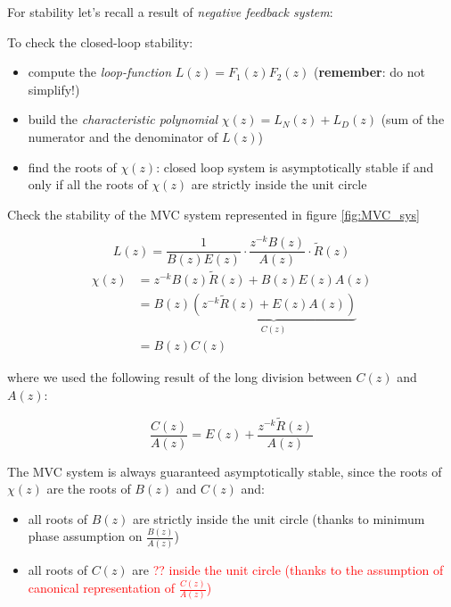 \begin{recall}
    For stability let's recall a result of \emph{negative feedback system}:
    \begin{figure}[H]
        \centering
    \end{figure}

    To check the closed-loop stability:
    \begin{itemize}
        \item compute the \emph{loop-function} $L(z) = F_1(z) F_2(z)$ (\textbf{remember}: do not simplify!)
        \item build the \emph{characteristic polynomial} $\chi(z) = L_N(z) + L_D(z)$ (sum of the numerator and the denominator of $L(z)$)
        \item find the roots of $\chi(z)$: closed loop system is asymptotically stable if and only if all the roots of $\chi(z)$ are strictly inside the unit circle
    \end{itemize}
\end{recall}

Check the stability of the MVC system represented in figure \ref{fig:MVC_sys}

\[
    L(z) = \frac{1}{B(z)E(z)}\cdot \frac{z^{-k}B(z)}{A(z)}\cdot\tilde{R}(z)
\]
\begin{align*}
    \chi(z) &= z^{-k}B(z)\tilde{R}(z) + B(z)E(z)A(z) \\
    &= B(z) \underbrace{\left( z^{-k}\tilde{R}(z)+E(z)A(z) \right)}_{C(z)}  \\
    &= B(z)C(z)
\end{align*}

where we used the following result of the long division between $C(z)$ and $A(z)$:

\[ \frac{C(z)}{A(z)} = E(z) + \frac{z^{-k} \tilde{R}(z)}{A(z)} \]

The MVC system is always guaranteed asymptotically stable, since the roots of $\chi(z)$ are the roots of $B(z)$ and $C(z)$ and:
\begin{itemize}
    \item all roots of $B(z)$ are strictly inside the unit circle (thanks to minimum phase assumption on $\frac{B(z)}{A(z)}$)
    \item all roots of $C(z)$ are \textcolor{red}{?? inside the unit circle (thanks to the assumption of canonical representation of $\frac{C(z)}{A(z)}$)}
\end{itemize}

